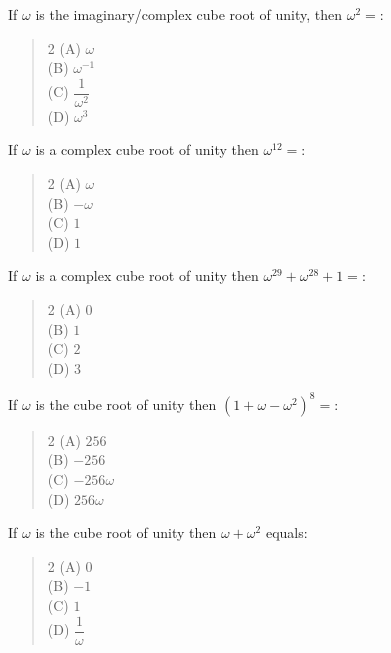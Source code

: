 \documentclass[11pt,a4paper]{article}
\begin{document}
\begin{mcqlist}
\item If $\omega$ is the imaginary/complex cube root of unity, then $\omega^2 = $:
\begin{quote}\begin{multicols}{2}
\noindent (A) $\omega$ \\
(B) $\omega^{-1}$ \\
(C) $\dfrac{1}{\omega^2}$ \\
(D) $\omega^3$
\end{multicols}\end{quote}

\item If $\omega$ is a complex cube root of unity then $\omega^{12}=$:
\begin{quote}\begin{multicols}{2}
\noindent (A) $\omega$ \\
(B) $-\omega$ \\
(C) $1$ \\
(D) $1$
\end{multicols}\end{quote}

\item If $\omega$ is a complex cube root of unity then $\omega^{29}+\omega^{28}+1=$:
\begin{quote}\begin{multicols}{2}
\noindent (A) $0$ \\
(B) $1$ \\
(C) $2$ \\
(D) $3$
\end{multicols}\end{quote}

\item If $\omega$ is the cube root of unity then $(1+\omega-\omega^2)^8=$:
\begin{quote}\begin{multicols}{2}
\noindent (A) $256$ \\
(B) $-256$ \\
(C) $-256\omega$ \\
(D) $256\omega$
\end{multicols}\end{quote}

\item If $\omega$ is the cube root of unity then $\omega+\omega^2$ equals:
\begin{quote}\begin{multicols}{2}
\noindent (A) $0$ \\
(B) $-1$ \\
(C) $1$ \\
(D) $\dfrac{1}{\omega}$
\end{multicols}\end{quote}


\end{mcqlist}
\end{document}
